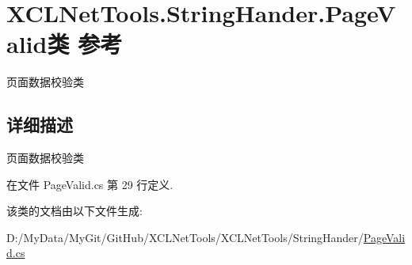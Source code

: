 \hypertarget{class_x_c_l_net_tools_1_1_string_hander_1_1_page_valid}{\section{X\-C\-L\-Net\-Tools.\-String\-Hander.\-Page\-Valid类 参考}
\label{class_x_c_l_net_tools_1_1_string_hander_1_1_page_valid}
}


页面数据校验类  




\subsection{详细描述}
页面数据校验类 



在文件 Page\-Valid.\-cs 第 29 行定义.



该类的文档由以下文件生成\-:\begin{DoxyCompactItemize}
\item 
D\-:/\-My\-Data/\-My\-Git/\-Git\-Hub/\-X\-C\-L\-Net\-Tools/\-X\-C\-L\-Net\-Tools/\-String\-Hander/\hyperlink{_page_valid_8cs}{Page\-Valid.\-cs}\end{DoxyCompactItemize}
